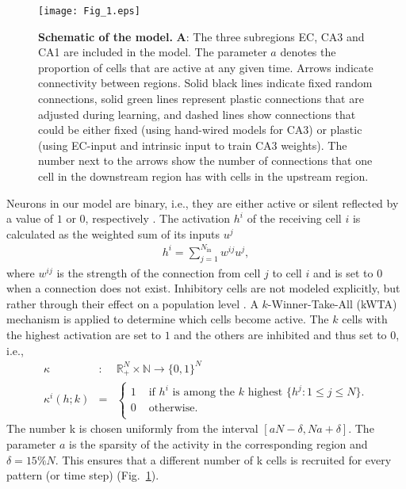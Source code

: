 \documentclass[utf8]{frontiersSCNS} %
\begin{document}
\begin{figure}[!htb]
\centering\texttt{[image: Fig\_1.eps]}
\caption{\textbf{Schematic of the model.} \textbf A: The three subregions EC, CA3 and CA1 are included in the model. The parameter $a$ denotes the proportion of cells that are active at any given time. Arrows indicate connectivity between regions. Solid black lines indicate fixed random connections, solid green lines represent plastic connections that are adjusted during learning, and dashed lines show connections that could be either fixed (using hand-wired models for CA3) or plastic (using EC-input and intrinsic input to train CA3 weights). The number next to the arrows show the number of connections that one cell in the downstream region has with cells in the upstream region.}
\label{Fig_1}
\end{figure}

Neurons in our model are binary, i.e., they are either active or silent reflected by a value of $1$ or $0$, respectively \citep{fontanari1995model}.
%
The activation $h^i$ of the receiving cell $i$ is calculated as the weighted sum of its inputs $u^j$
\begin{align}
	\label{activation}
	h^i = \sum_{j=1}^{N_\mathrm{in}} w^{ij}u^j,
\end{align}  
where $w^{ij}$ is the strength of the connection from cell $j$ to cell $i$ and is set to $0$ when a connection does not exist. Inhibitory cells are not modeled explicitly, but rather through their effect on a population level \citep{renno2010mechanism, roudi2008representing, moustafa2009neurocomputational, appleby2011role, monaco2011modular}. A $k$-Winner-Take-All (kWTA) mechanism is applied to determine which cells become active. The $k$ cells with the highest activation are set to $1$ and the others are inhibited and thus set to $0$, i.e.,
\begin{eqnarray}
\label{eq:kWTA}
	\kappa &:& \mathbb{R}_+^N \times \mathbb{N} \to \{0,1\}^N \\
	\kappa^i (h;k) &=& \left \{ \begin{array}{ll}
			1 &\text{ if $h^i$ is among the $k$ highest } \{ h^j:1\le j\le N \}. \\
			0 &\text{ otherwise}.\\
	\end{array} \right.
	\label{eq:binary}
\end{eqnarray}
The number k is chosen uniformly from the interval $ [aN - \delta , Na + \delta ]$. The parameter $a$ is the sparsity of the activity in the corresponding region and $\delta = 15\%  N$. This ensures that a different number of k cells is recruited for every pattern (or time step) (Fig.~\ref{Fig_1}).
\end{document}
